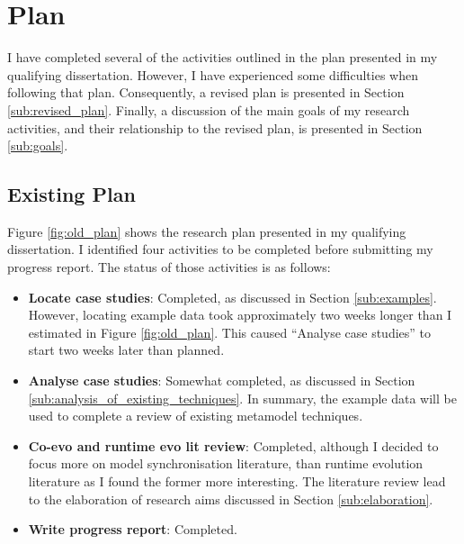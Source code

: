 \section{Plan}
I have completed several of the activities outlined in the plan presented in my qualifying dissertation. However, I have experienced some difficulties when following that plan. Consequently, a revised plan is presented in Section \ref{sub:revised_plan}. Finally, a discussion of the main goals of my research activities, and their relationship to the revised plan, is presented in Section \ref{sub:goals}.


\subsection{Existing Plan}
\label{sub:existing_plan}
Figure \ref{fig:old_plan} shows the research plan presented in my qualifying dissertation. I identified four activities to be completed before submitting my progress report. The status of those activities is as follows:

\begin{itemize}
	\item \textbf{Locate case studies}: Completed, as discussed in Section \ref{sub:examples}. However, locating example data took approximately two weeks longer than I estimated in Figure \ref{fig:old_plan}. This caused ``Analyse case studies'' to start two weeks later than planned.
	\item \textbf{Analyse case studies}: Somewhat completed, as discussed in Section \ref{sub:analysis_of_existing_techniques}. In summary, the example data will be used to complete a review of existing metamodel techniques.
	\item \textbf{Co-evo and runtime evo lit review}: Completed, although I decided to focus more on model synchronisation literature, than runtime evolution literature as I found the former more interesting. The literature review lead to the elaboration of research aims discussed in Section \ref{sub:elaboration}.
	\item \textbf{Write progress report}: Completed.
\end{itemize}

